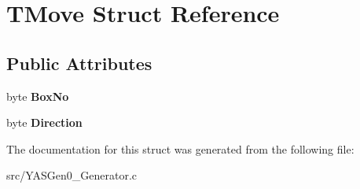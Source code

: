 \hypertarget{struct_t_move}{}\section{T\+Move Struct Reference}
\label{struct_t_move}
\subsection*{Public Attributes}
\begin{DoxyCompactItemize}
\item 
\mbox{\label{struct_t_move_a5768df8e51347128fd724d36884a29f0}} 
byte {\bfseries Box\+No}
\item 
\mbox{\label{struct_t_move_a3115b2fb47171d466ee3377099d63d1c}} 
byte {\bfseries Direction}
\end{DoxyCompactItemize}


The documentation for this struct was generated from the following file\+:\begin{DoxyCompactItemize}
\item 
src/Y\+A\+S\+Gen0\+\_\+\+Generator.\+c\end{DoxyCompactItemize}

